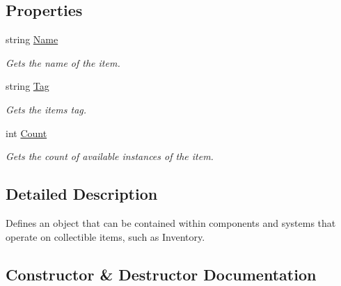 \subsection*{Properties}
\begin{DoxyCompactItemize}
\item 
string \hyperlink{class_midnight_blue_1_1_engine_1_1_collectable_ac98670a6322f2dc0ecf173d1a5cced39}{Name}
\begin{DoxyCompactList}\small\item\em Gets the name of the item. \end{DoxyCompactList}\item 
string \hyperlink{class_midnight_blue_1_1_engine_1_1_collectable_aa92d9bc3bf5cf9d01bbb92429293be56}{Tag}
\begin{DoxyCompactList}\small\item\em Gets the items tag. \end{DoxyCompactList}\item 
int \hyperlink{class_midnight_blue_1_1_engine_1_1_collectable_a61bb027d19c487afab716c9a0e73e6a0}{Count}
\begin{DoxyCompactList}\small\item\em Gets the count of available instances of the item. \end{DoxyCompactList}\end{DoxyCompactItemize}


\subsection{Detailed Description}
Defines an object that can be contained within components and systems that operate on collectible items, such as Inventory. 



\subsection{Constructor \& Destructor Documentation}
\hypertarget{class_midnight_blue_1_1_engine_1_1_collectable_add10299d380236ae2ba2a0c6fe32a769}{}\label{class_midnight_blue_1_1_engine_1_1_collectable_add10299d380236ae2ba2a0c6fe32a769} 
